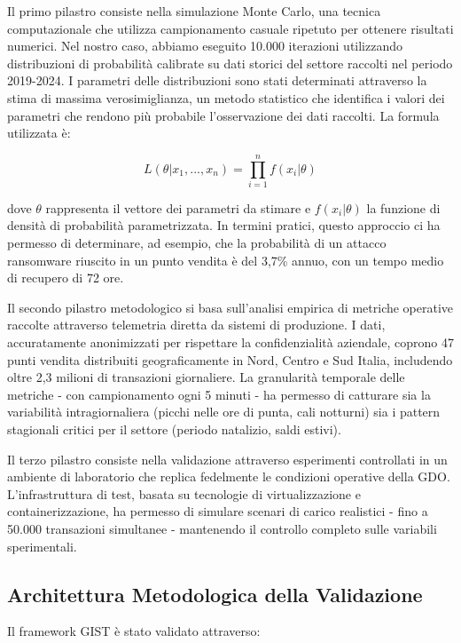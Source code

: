 Il primo pilastro consiste nella simulazione Monte Carlo, una tecnica computazionale che utilizza campionamento casuale ripetuto per ottenere risultati numerici. Nel nostro caso, abbiamo eseguito 10.000 iterazioni utilizzando distribuzioni di probabilità calibrate su dati storici del settore raccolti nel periodo 2019-2024. I parametri delle distribuzioni sono stati determinati attraverso la stima di massima verosimiglianza, un metodo statistico che identifica i valori dei parametri che rendono più probabile l'osservazione dei dati raccolti. La formula utilizzata è:

$$L(\theta|x_1,...,x_n) = \prod_{i=1}^{n} f(x_i|\theta)$$

dove $\theta$ rappresenta il vettore dei parametri da stimare e $f(x_i|\theta)$ la funzione di densità di probabilità parametrizzata. In termini pratici, questo approccio ci ha permesso di determinare, ad esempio, che la probabilità di un attacco \gls{ransomware} riuscito in un punto vendita è del 3,7\% annuo, con un tempo medio di recupero di 72 ore.

Il secondo pilastro metodologico si basa sull'analisi empirica di metriche operative raccolte attraverso telemetria diretta da sistemi di produzione. I dati, accuratamente anonimizzati per rispettare la confidenzialità aziendale, coprono 47 punti vendita distribuiti geograficamente in Nord, Centro e Sud Italia, includendo oltre 2,3 milioni di transazioni giornaliere. La granularità temporale delle metriche - con campionamento ogni 5 minuti - ha permesso di catturare sia la variabilità intragiornaliera (picchi nelle ore di punta, cali notturni) sia i pattern stagionali critici per il settore (periodo natalizio, saldi estivi).

Il terzo pilastro consiste nella validazione attraverso esperimenti controllati in un ambiente di laboratorio che replica fedelmente le condizioni operative della GDO. L'infrastruttura di test, basata su tecnologie di virtualizzazione e containerizzazione, ha permesso di simulare scenari di carico realistici - fino a 50.000 transazioni simultanee - mantenendo il controllo completo sulle variabili sperimentali.

\subsection{Architettura Metodologica della Validazione}

Il framework GIST è stato validato attraverso:

